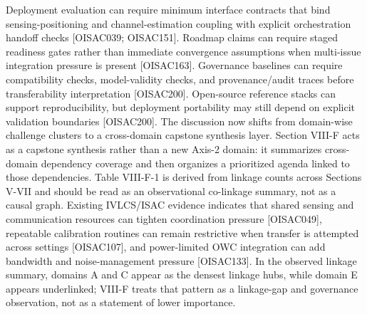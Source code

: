 {}
\markdownRendererSectionEnd \markdownRendererSectionBegin
{}\markdownRendererInterblockSeparator
{}\markdownRendererUlBeginTight
\markdownRendererUlItem Deployment evaluation can require minimum interface contracts that bind sensing-positioning and channel-estimation coupling with explicit orchestration handoff checks [O\markdownRendererUnderscore{}ISAC\markdownRendererUnderscore{}039; O\markdownRendererUnderscore{}ISAC\markdownRendererUnderscore{}151].\markdownRendererUlItemEnd 
\markdownRendererUlItem Roadmap claims can require staged readiness gates rather than immediate convergence assumptions when multi-issue integration pressure is present [O\markdownRendererUnderscore{}ISAC\markdownRendererUnderscore{}163].\markdownRendererUlItemEnd 
\markdownRendererUlItem Governance baselines can require compatibility checks, model-validity checks, and provenance/audit traces before transferability interpretation [O\markdownRendererUnderscore{}ISAC\markdownRendererUnderscore{}200].\markdownRendererUlItemEnd 
\markdownRendererUlItem Open-source reference stacks can support reproducibility, but deployment portability may still depend on explicit validation boundaries [O\markdownRendererUnderscore{}ISAC\markdownRendererUnderscore{}200].\markdownRendererUlItemEnd 
\markdownRendererUlEndTight \markdownRendererInterblockSeparator
{}The discussion now shifts from domain-wise challenge clusters to a cross-domain capstone synthesis layer.\markdownRendererInterblockSeparator
{}
\markdownRendererSectionEnd 
\markdownRendererSectionEnd \markdownRendererSectionBegin
{}\markdownRendererInterblockSeparator
{}Section VIII-F acts as a capstone synthesis rather than a new Axis-2 domain: it summarizes cross-domain dependency coverage and then organizes a prioritized agenda linked to those dependencies. Table VIII-F-1 is derived from linkage counts across Sections V-VII and should be read as an observational co-linkage summary, not as a causal graph. Existing IVLCS/ISAC evidence indicates that shared sensing and communication resources can tighten coordination pressure [O\markdownRendererUnderscore{}ISAC\markdownRendererUnderscore{}049], repeatable calibration routines can remain restrictive when transfer is attempted across settings [O\markdownRendererUnderscore{}ISAC\markdownRendererUnderscore{}107], and power-limited OWC integration can add bandwidth and noise-management pressure [O\markdownRendererUnderscore{}ISAC\markdownRendererUnderscore{}133]. In the observed linkage summary, domains A and C appear as the densest linkage hubs, while domain E appears underlinked; VIII-F treats that pattern as a linkage-gap and governance observation, not as a statement of lower importance.\markdownRendererParagraphSeparator
